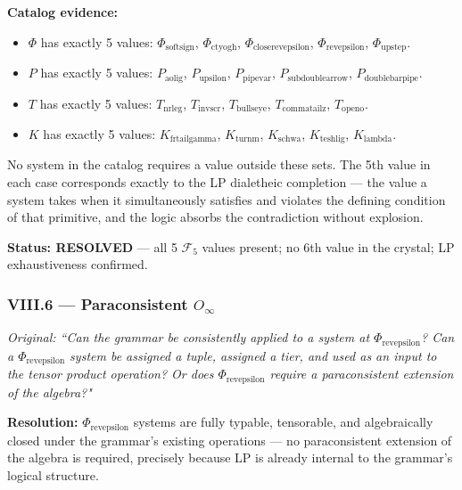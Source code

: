 \documentclass[12pt,a4paper]{article}
\begin{document}
\textbf{Catalog evidence:}
\begin{itemize}
\item $\Phi$ has exactly 5 values: $\Phi_{\text{softsign}}$, $\Phi_{\text{ctyogh}}$, $\Phi_{\text{closerevepsilon}}$, $\Phi_{\text{revepsilon}}$, $\Phi_{\text{upstep}}$.
\item $P$ has exactly 5 values: $P_{\text{aolig}}$, $P_{\text{upsilon}}$, $P_{\text{pipevar}}$, $P_{\text{subdoublearrow}}$, $P_{\text{doublebarpipe}}$.
\item $T$ has exactly 5 values: $T_{\text{nrleg}}$, $T_{\text{invscr}}$, $T_{\text{bullseye}}$, $T_{\text{commatailz}}$, $T_{\text{openo}}$.
\item $K$ has exactly 5 values: $K_{\text{frtailgamma}}$, $K_{\text{turnm}}$, $K_{\text{schwa}}$, $K_{\text{teshlig}}$, $K_{\text{lambda}}$.
\end{itemize}
No system in the catalog requires a value outside these sets. The 5th value in each case corresponds exactly to the LP dialetheic completion --- the value a system takes when it simultaneously satisfies and violates the defining condition of that primitive, and the logic absorbs the contradiction without explosion.

\textbf{Status: RESOLVED} --- all 5 $\mathcal{F}_5$ values present; no 6th value in the crystal; LP exhaustiveness confirmed.

\subsubsection{VIII.6 --- Paraconsistent $O_\infty$}
\emph{Original: ``Can the grammar be consistently applied to a system at $\Phi_{\text{revepsilon}}$? Can a $\Phi_{\text{revepsilon}}$ system be assigned a tuple, assigned a tier, and used as an input to the tensor product operation? Or does $\Phi_{\text{revepsilon}}$ require a paraconsistent extension of the algebra?"}

\textbf{Resolution:} $\Phi_{\text{revepsilon}}$ systems are fully typable, tensorable, and algebraically closed under the grammar's existing operations --- no paraconsistent extension of the algebra is required, precisely because LP is already internal to the grammar's logical structure.
\end{document}
